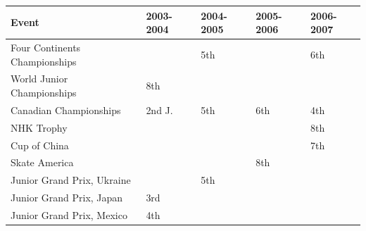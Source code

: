 \documentclass{article}
\begin{document}
\begin{tabular}{lllll}
\toprule
Event & 2003-2004 & 2004-2005 & 2005-2006 & 2006-2007 \\
\midrule
Four Continents Championships &  & 5th &  & 6th \\
World Junior Championships & 8th &  &  &  \\
Canadian Championships & 2nd J. & 5th & 6th & 4th \\
NHK Trophy &  &  &  & 8th \\
Cup of China &  &  &  & 7th \\
Skate America &  &  & 8th &  \\
Junior Grand Prix, Ukraine &  & 5th &  &  \\
Junior Grand Prix, Japan & 3rd &  &  &  \\
Junior Grand Prix, Mexico & 4th &  &  &  \\
\bottomrule
\end{tabular}
\end{document}
